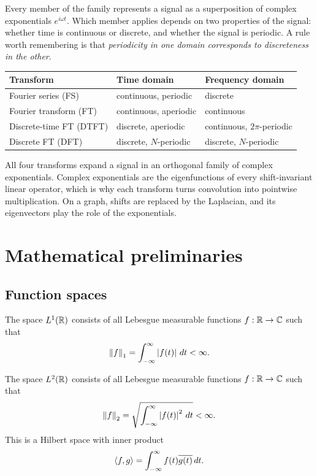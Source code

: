 \begin{notechapter}
Every member of the family represents a signal as a superposition of complex exponentials $e^{i\omega t}$. Which member applies depends on two properties of the signal: whether time is continuous or discrete, and whether the signal is periodic. A rule worth remembering is that \emph{periodicity in one domain corresponds to discreteness in the other}.

\begin{center}
\begin{tabular}{lll}
\toprule
Transform & Time domain & Frequency domain \\
\midrule
Fourier series (FS) & continuous, periodic & discrete \\
Fourier transform (FT) & continuous, aperiodic & continuous \\
Discrete-time FT (DTFT) & discrete, aperiodic & continuous, $2\pi$-periodic \\
Discrete FT (DFT) & discrete, $N$-periodic & discrete, $N$-periodic \\
\bottomrule
\end{tabular}
\end{center}

\begin{keyidea}
All four transforms expand a signal in an orthogonal family of complex exponentials. Complex exponentials are the eigenfunctions of every shift-invariant linear operator, which is why each transform turns convolution into pointwise multiplication. On a graph, shifts are replaced by the Laplacian, and its eigenvectors play the role of the exponentials.
\end{keyidea}

\section{Mathematical preliminaries}

\subsection{Function spaces}

\begin{definition}[$L^1$ space]
The space $L^1(\mathbb{R})$ consists of all Lebesgue measurable functions $f:\mathbb{R} \to \mathbb{C}$ such that
\[
\left\|f\right\|_1 = \int_{-\infty}^{\infty} \left|f(t)\right| \, dt < \infty.
\]
\end{definition}

\begin{definition}[$L^2$ space]
The space $L^2(\mathbb{R})$ consists of all Lebesgue measurable functions $f:\mathbb{R} \to \mathbb{C}$ such that
\[
\left\|f\right\|_2 = \sqrt{\int_{-\infty}^{\infty} \left|f(t)\right|^2 \, dt} < \infty.
\]
This is a Hilbert space with inner product
\[
\left\langle f, g \right\rangle = \int_{-\infty}^{\infty} f(t) \overline{g(t)} \, dt.
\]
\end{definition}


\end{notechapter}
